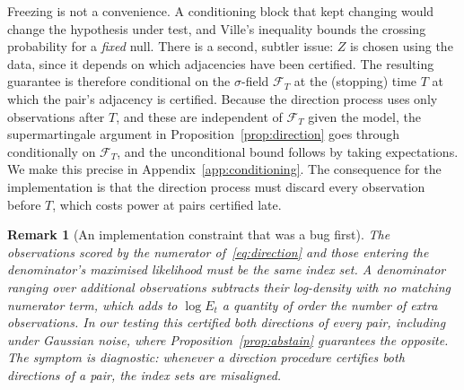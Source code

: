 \documentclass[pdflatex,sn-apa]{sn-jnl}
\theoremstyle{thmstyleone}%
\theoremstyle{thmstyletwo}%
\newtheorem{remark}{Remark}%
\theoremstyle{thmstylethree}%
\newcommand{\Fcal}{\mathcal{F}}
\begin{document}
Freezing is not a convenience. A conditioning block that kept changing would
change the hypothesis under test, and Ville's inequality bounds the crossing
probability for a \emph{fixed} null. There is a second, subtler issue:
$Z$ is chosen using the data, since it depends on which adjacencies have been
certified. The resulting guarantee is therefore conditional on the
$\sigma$-field $\Fcal_T$ at the (stopping) time $T$ at which the pair's
adjacency is certified. Because the direction process uses only observations
after $T$, and these are independent of $\Fcal_T$ given the model, the
supermartingale argument in Proposition~\ref{prop:direction} goes through
conditionally on $\Fcal_T$, and the unconditional bound follows by taking
expectations. We make this precise in Appendix~\ref{app:conditioning}. The
consequence for the implementation is that the direction process must discard
every observation before $T$, which costs power at pairs certified late.

\begin{remark}[An implementation constraint that was a bug first]
\label{rem:samesupport}
The observations scored by the numerator of~\eqref{eq:direction} and those
entering the denominator's maximised likelihood must be the \emph{same} index
set. A denominator ranging over additional observations subtracts their
log-density with no matching numerator term, which adds to $\log E_t$ a
quantity of order the number of extra observations. In our testing this
certified \emph{both} directions of every pair, including under Gaussian
noise, where Proposition~\ref{prop:abstain} guarantees the opposite. The
symptom is diagnostic: whenever a direction procedure certifies both
directions of a pair, the index sets are misaligned.
\end{remark}
\end{document}
